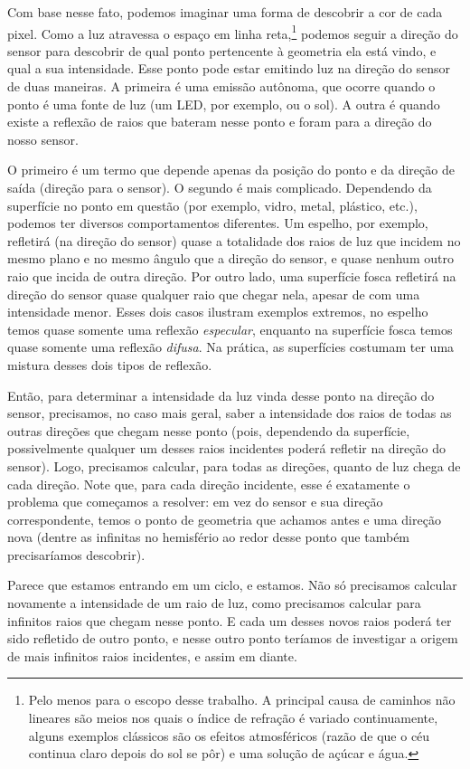 Com base nesse fato, podemos imaginar uma forma de descobrir a cor de cada
pixel. Como a luz atravessa o espaço em linha reta,\footnote{Pelo menos para o
escopo desse trabalho. A principal causa de caminhos não lineares são meios nos
quais o índice de refração é variado continuamente, alguns exemplos clássicos
são os efeitos atmosféricos (razão de que o céu continua claro depois do sol se
pôr) e uma solução de açúcar e água.} podemos seguir a direção do sensor para
descobrir de qual ponto pertencente à geometria ela está vindo, e qual a sua
intensidade. Esse ponto pode estar emitindo luz na direção do sensor de duas
maneiras. A primeira é uma emissão autônoma, que ocorre quando o ponto é uma
fonte de luz (um LED, por exemplo, ou o sol). A outra é quando existe a
reflexão de raios que bateram nesse ponto e foram para a direção do nosso
sensor.

O primeiro é um termo que depende apenas da posição do ponto e da direção de
saída (direção para o sensor). O segundo é mais complicado. Dependendo da
superfície no ponto em questão (por exemplo, vidro, metal, plástico, etc.),
podemos ter diversos comportamentos diferentes. Um espelho, por exemplo,
refletirá (na direção do sensor) quase a totalidade dos raios de luz que
incidem no mesmo plano e no mesmo ângulo que a direção do sensor, e quase
nenhum outro raio que incida de outra direção. Por outro lado, uma superfície
fosca refletirá na direção do sensor quase qualquer raio que chegar nela,
apesar de com uma intensidade menor. Esses dois casos ilustram exemplos
extremos, no espelho temos quase somente uma reflexão \emph{especular},
enquanto na superfície fosca temos quase somente uma reflexão \emph{difusa}. Na
prática, as superfícies costumam ter uma mistura desses dois tipos de reflexão.

Então, para determinar a intensidade da luz vinda desse ponto na direção do
sensor, precisamos, no caso mais geral, saber a intensidade dos raios de todas
as outras direções que chegam nesse ponto (pois, dependendo da superfície,
possivelmente qualquer um desses raios incidentes poderá refletir na direção do
sensor). Logo, precisamos calcular, para todas as direções, quanto de luz chega
de cada direção. Note que, para cada direção incidente, esse é exatamente o
problema que começamos a resolver: em vez do sensor e sua direção
correspondente, temos o ponto de geometria que achamos antes e uma direção nova
(dentre as infinitas no hemisfério ao redor desse ponto que também
precisaríamos descobrir).

Parece que estamos entrando em um ciclo, e estamos. Não só precisamos calcular
novamente a intensidade de um raio de luz, como precisamos calcular para
infinitos raios que chegam nesse ponto. E cada um desses novos raios poderá ter
sido refletido de outro ponto, e nesse outro ponto teríamos de investigar a
origem de mais infinitos raios incidentes, e assim em diante.


